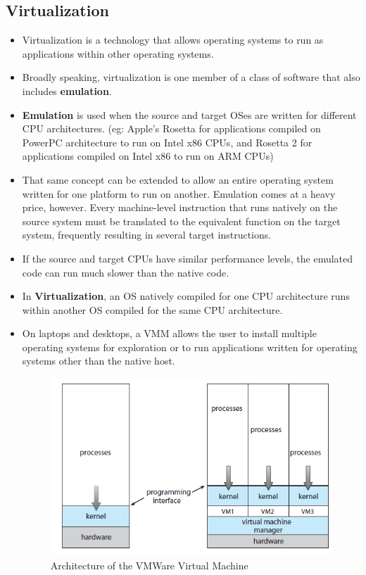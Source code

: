 \documentclass{article}
\theoremstyle{plain}
\theoremstyle{definition}
\begin{document}
\subsection{Virtualization}
\begin{itemize}
    \item Virtualization is a technology that allows operating systems to run as applications within other operating systems.
    
    \item Broadly speaking, virtualization is one member of a class of software that also includes \textbf{emulation}.
    
    \item \textbf{Emulation} is used when the source and target OSes are written for different CPU architectures. (eg: Apple's Rosetta for applications compiled on PowerPC architecture to run on Intel x86 CPUs, and Rosetta 2 for applications compiled on Intel x86 to run on ARM CPUs)
    
    \item That same concept can be extended to allow an entire operating system written for one platform to run on another. Emulation comes at a heavy price, however. Every machine-level instruction that runs natively on the source system must be translated to the equivalent function on the target system, frequently resulting in several target instructions. 
    
    \item If the source and target CPUs have similar performance levels, the emulated code can run much slower than the native code.
    
    \item In \textbf{Virtualization}, an OS natively compiled for one CPU architecture runs within another OS compiled for the same CPU architecture. 
    
    \item On laptops and desktops, a VMM allows the user to install multiple operating systems for exploration or to run applications written for operating systems other than the native host.
    
    \begin{figure}[h]
        \centering
        \includegraphics{os9.png}
        \caption{Architecture of the VMWare Virtual Machine}
        \label{fig:my_label_9}
    \end{figure}
\end{itemize}
\end{document}
